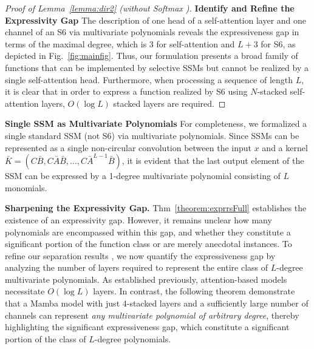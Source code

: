 \begin{proof}[Proof of Lemma~\ref{lemma:dir2} (without Softmax%
)]
\noindent\textbf{Identify and Refine the Expressivity Gap\quad} The description of one head of a self-attention layer and one channel of an S6 via multivariate polynomials reveals the expressiveness gap in terms of the maximal degree, which is 3 for self-attention and $L+3$ for S6, as depicted in %
Fig.~\ref{fig:mainfig}. Thus, our formulation presents a broad family of functions that can be implemented by selective SSMs but cannot be realized by a single self-attention head. Furthermore, when processing a sequence of length $L$, it is clear that in order to express a function realized by S6 using $N$-stacked self-attention layers, $O(\log L)$ stacked layers are required.
\end{proof}

\noindent\textbf{Single SSM as Multivariate Polynomials\quad} For completeness, we formalized a single standard SSM (not S6) via multivariate polynomials. Since SSMs can be represented as a single non-circular convolution between the input \(x\) and a kernel \(\bar{K} = (C\bar{B}, C\bar{A}\bar{B}, \ldots, C\bar{A}^{L-1}\bar{B})\), it is evident that the last output element of the SSM can be expressed by a 1-degree multivariate polynomial consisting of \(L\) monomials.%
%
%



\noindent\textbf{Sharpening the Expressivity Gap.} 
Thm~\ref{theorem:exprrsFull} establishes the existence of an expressivity gap. However, it remains unclear how many polynomials are encompassed within this gap, and whether they constitute a significant portion of the function class or are merely anecdotal instances. To refine our separation results %
, we now quantify the expressiveness gap by analyzing the number of layers required to represent the entire class of $L$-degree multivariate polynomials. As established previously, attention-based models necessitate $O(\log L)$ layers. In contrast, the following theorem demonstrate that a Mamba model with just 4-stacked layers and a sufficiently large number of channels can represent \textit{any multivariate polynomial of arbitrary degree}, thereby highlighting the significant expressiveness gap, which constitute a significant portion of the class of $L$-degree polynomials.%

